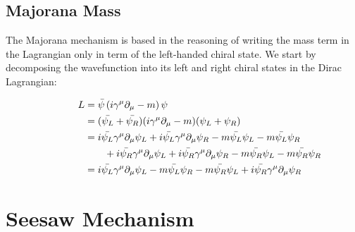 \subsection{Majorana Mass}


The Majorana mechanism is based in the reasoning of writing the mass term in the Lagrangian only in term of the left-handed chiral state. We start by decomposing the wavefunction into its left and right chiral states in the Dirac Lagrangian: 


\begin{align}
  \phantom{i = j = k}
  &\begin{aligned}
    \mathllap{L} &= \bar{\psi} \left( i \gamma ^\mu \partial_{\mu} - m \right) \psi \\
    \mathllap{}  &= (\bar{\psi_L} + \bar{\psi_R})( i \gamma ^\mu \partial_{\mu} - m)(\psi_L + \psi_R) \\
    \mathllap{}  &= i \bar{\psi_L} \gamma ^\mu \partial_{\mu} \psi_L + i \bar{\psi_L} \gamma ^\mu \partial_{\mu} \psi_R - m \bar{\psi_L} \psi_L - m \bar{\psi_L} \psi_R \\
  &\qquad + i \bar{\psi_R} \gamma ^\mu \partial_{\mu} \psi_L + i \bar{\psi_R} \gamma ^\mu \partial_{\mu} \psi_R - m \bar{\psi_R} \psi_L - m \bar{\psi_R} \psi_R \\
  \end{aligned}\\
  &\begin{aligned}
   \mathllap{} &= i \bar{\psi_L} \gamma ^\mu \partial_{\mu} \psi_L - m \bar{\psi_L} \psi_R - m \bar{\psi_R} \psi_L + i \bar{\psi_R} \gamma ^\mu \partial_{\mu} \psi_R \\
   \end{aligned}
\end{align}


\section{Seesaw Mechanism}

